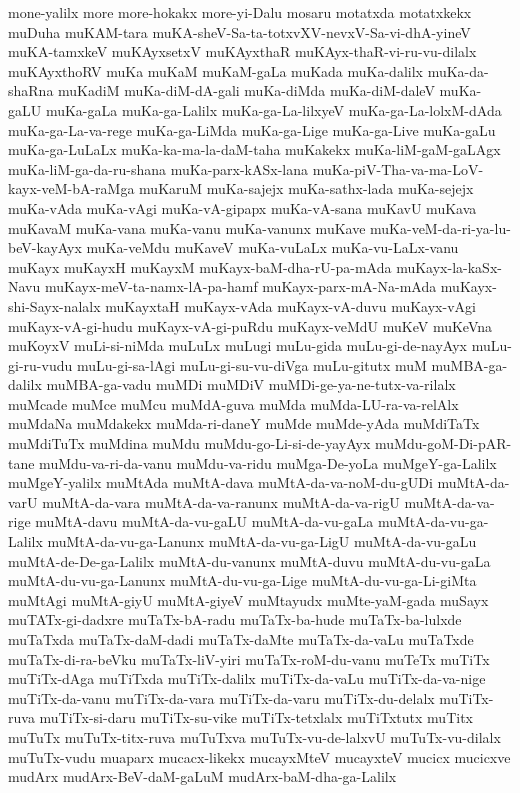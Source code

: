 {mone-yalilx
more
more-hokakx
more-yi-Dalu
mosaru
motatxda
motatxkekx
muDuha
muKAM-tara
muKA-sheV-Sa-ta-totxvXV-nevxV-Sa-vi-dhA-yineV
muKA-tamxkeV
muKAyxsetxV
muKAyxthaR
muKAyx-thaR-vi-ru-vu-dilalx
muKAyxthoRV
muKa
muKaM
muKaM-gaLa
muKada
muKa-dalilx
muKa-da-shaRna
muKadiM
muKa-diM-dA-gali
muKa-diMda
muKa-diM-daleV
muKa-gaLU
muKa-gaLa
muKa-ga-Lalilx
muKa-ga-La-lilxyeV
muKa-ga-La-lolxM-dAda
muKa-ga-La-va-rege
muKa-ga-LiMda
muKa-ga-Lige
muKa-ga-Live
muKa-gaLu
muKa-ga-LuLaLx
muKa-ka-ma-la-daM-taha
muKakekx
muKa-liM-gaM-gaLAgx
muKa-liM-ga-da-ru-shana
muKa-parx-kASx-lana
muKa-piV-Tha-va-ma-LoV-kayx-veM-bA-raMga
muKaruM
muKa-sajejx
muKa-sathx-lada
muKa-sejejx
muKa-vAda
muKa-vAgi
muKa-vA-gipapx
muKa-vA-sana
muKavU
muKava
muKavaM
muKa-vana
muKa-vanu
muKa-vanunx
muKave
muKa-veM-da-ri-ya-lu-beV-kayAyx
muKa-veMdu
muKaveV
muKa-vuLaLx
muKa-vu-LaLx-vanu
muKayx
muKayxH
muKayxM
muKayx-baM-dha-rU-pa-mAda
muKayx-la-kaSx-Navu
muKayx-meV-ta-namx-lA-pa-hamf
muKayx-parx-mA-Na-mAda
muKayx-shi-Sayx-nalalx
muKayxtaH
muKayx-vAda
muKayx-vA-duvu
muKayx-vAgi
muKayx-vA-gi-hudu
muKayx-vA-gi-puRdu
muKayx-veMdU
muKeV
muKeVna
muKoyxV
muLi-si-niMda
muLuLx
muLugi
muLu-gida
muLu-gi-de-nayAyx
muLu-gi-ru-vudu
muLu-gi-sa-lAgi
muLu-gi-su-vu-diVga
muLu-gitutx
muM
muMBA-ga-dalilx
muMBA-ga-vadu
muMDi
muMDiV
muMDi-ge-ya-ne-tutx-va-rilalx
muMcade
muMce
muMcu
muMdA-guva
muMda
muMda-LU-ra-va-relAlx
muMdaNa
muMdakekx
muMda-ri-daneY
muMde
muMde-yAda
muMdiTaTx
muMdiTuTx
muMdina
muMdu
muMdu-go-Li-si-de-yayAyx
muMdu-goM-Di-pAR-tane
muMdu-va-ri-da-vanu
muMdu-va-ridu
muMga-De-yoLa
muMgeY-ga-Lalilx
muMgeY-yalilx
muMtAda
muMtA-dava
muMtA-da-va-noM-du-gUDi
muMtA-da-varU
muMtA-da-vara
muMtA-da-va-ranunx
muMtA-da-va-rigU
muMtA-da-va-rige
muMtA-davu
muMtA-da-vu-gaLU
muMtA-da-vu-gaLa
muMtA-da-vu-ga-Lalilx
muMtA-da-vu-ga-Lanunx
muMtA-da-vu-ga-LigU
muMtA-da-vu-gaLu
muMtA-de-De-ga-Lalilx
muMtA-du-vanunx
muMtA-duvu
muMtA-du-vu-gaLa
muMtA-du-vu-ga-Lanunx
muMtA-du-vu-ga-Lige
muMtA-du-vu-ga-Li-giMta
muMtAgi
muMtA-giyU
muMtA-giyeV
muMtayudx
muMte-yaM-gada
muSayx
muTATx-gi-dadxre
muTaTx-bA-radu
muTaTx-ba-hude
muTaTx-ba-lulxde
muTaTxda
muTaTx-daM-dadi
muTaTx-daMte
muTaTx-da-vaLu
muTaTxde
muTaTx-di-ra-beVku
muTaTx-liV-yiri
muTaTx-roM-du-vanu
muTeTx
muTiTx
muTiTx-dAga
muTiTxda
muTiTx-dalilx
muTiTx-da-vaLu
muTiTx-da-va-nige
muTiTx-da-vanu
muTiTx-da-vara
muTiTx-da-varu
muTiTx-du-delalx
muTiTx-ruva
muTiTx-si-daru
muTiTx-su-vike
muTiTx-tetxlalx
muTiTxtutx
muTitx
muTuTx
muTuTx-titx-ruva
muTuTxva
muTuTx-vu-de-lalxvU
muTuTx-vu-dilalx
muTuTx-vudu
muaparx
mucacx-likekx
mucayxMteV
mucayxteV
mucicx
mucicxve
mudArx
mudArx-BeV-daM-gaLuM
mudArx-baM-dha-ga-Lalilx
}
